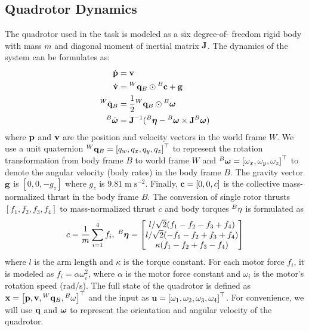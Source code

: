 \documentclass[letterpaper,journal,twoside]{IEEEtran}
\begin{document}
\subsection{Quadrotor Dynamics}
The quadrotor used in the task is modeled as a six degree-of-
freedom rigid body with mass $m$ and diagonal moment of 
inertial matrix $\mathbf{J}$.
The dynamics of the system can be formulates as: 
\begin{equation}
\label{eq:quadrotor_system}
\begin{aligned}
  \dot{\mathbf{p}} &= \mathbf{v}
  \\  
  \dot{\mathbf{v}} &= {}^W\mathbf{q}_B \odot {}^B\mathbf{c} + \mathbf{g}
  \\
  {}^W\dot{\mathbf{q}}_B &= \frac{1}{2} {}^W\mathbf{q}_B \odot {}^B{\boldsymbol{\omega}}
  \\
  {}^B\dot{{\boldsymbol{\omega}}} &= 
  \mathbf{J}^{-1}({}^B\mathbf{\boldsymbol{\eta}} - {}^B{\boldsymbol{\omega}} \times \mathbf{J}{}^B{\boldsymbol{\omega}})
\end{aligned}
\end{equation}
where $\mathbf{p}$ and $\mathbf{v}$ are the position and velocity 
vectors in the world frame $W$. 
We use a unit quaternion 
${}^W\mathbf{q}_B = \left[q_w, q_x, q_y, q_z\right]^\top$ 
to represent the rotation transformation from body frame 
$B$ to world frame $W$
and 
${}^B\boldsymbol{\omega} = \left[\omega_x, \omega_y, \omega_z\right]^\top$ to denote the angular velocity (body rates) in the 
body frame $B$.
The gravity vector $\mathbf{g}$ is $\left[0,0,-g_z\right]$ where
$g_z$ is $9.81\;\text{m}\;\text{s}^{-2}$.
Finally, $\mathbf{c} = \left[0,0,c\right]$ is the collective 
mass-normalized thrust in the body frame $B$. 
The conversion of single rotor thrusts 
$\left[f_1, f_2, f_3, f_4\right]$ to 
mass-normalized thrust $c$ 
and body torques ${}^B\mathbf{\eta}$ is formulated as
\[
  c = \frac{1}{m}\sum_{i=1}^4 f_i,\;
  {}^B{\boldsymbol{\eta}} = 
  \begin{bmatrix}
    l/\sqrt{2}(f_1 - f_2 - f_3 + f_4) \\
    l/\sqrt{2}(-f_1 - f_2 + f_3 + f_4) \\
    \kappa(f_1 - f_2 + f_3 - f_4)
  \end{bmatrix}
\]
where $l$ is the arm length and $\kappa$ is the torque 
constant.
For each motor force $f_i$, it is modeled as 
$f_i = \alpha \omega_i^2$, where $\alpha$ is the motor 
force constant and $\omega_i$ is the motor's rotation speed
(rad/s).
The full state of the quadrotor is defined as 
$\mathbf{x} = \left[\mathbf{p}, \mathbf{v}, {}^W{\mathbf{q}}_B, 
{}^B\mathbf{\omega}\right]^\top$ and the input as 
$\mathbf{u} = \left[\omega_1, \omega_2, \omega_3, 
\omega_4\right]^\top$.
For convenience, we will use $\mathbf{q}$ and $\boldsymbol{\omega}$ to represent
the orientation and angular velocity of the quadrotor.
\end{document}
